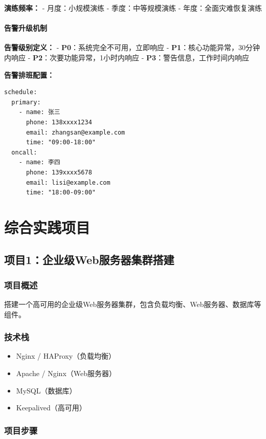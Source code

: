 \documentclass[12pt,UTF8]{ctexbook}
\begin{document}
\textbf{演练频率：}
- 月度：小规模演练
- 季度：中等规模演练
- 年度：全面灾难恢复演练

\subsubsection*{告警升级机制}

\textbf{告警级别定义：}
- \textbf{P0}：系统完全不可用，立即响应
- \textbf{P1}：核心功能异常，30分钟内响应
- \textbf{P2}：次要功能异常，1小时内响应
- \textbf{P3}：警告信息，工作时间内响应

\textbf{告警排班配置：}
\begin{lstlisting}
schedule:
  primary:
    - name: 张三
      phone: 138xxxx1234
      email: zhangsan@example.com
      time: "09:00-18:00"
  oncall:
    - name: 李四
      phone: 139xxxx5678
      email: lisi@example.com
      time: "18:00-09:00"
\end{lstlisting}

\chapter{综合实践项目}
\label{chap:practice-projects}

\section{项目1：企业级Web服务器集群搭建}
\label{sec:project-web-cluster}

\subsection*{项目概述}

搭建一个高可用的企业级Web服务器集群，包含负载均衡、Web服务器、数据库等组件。

\subsection*{技术栈}

\begin{itemize}
    \item Nginx / HAProxy（负载均衡）
    \item Apache / Nginx（Web服务器）
    \item MySQL（数据库）
    \item Keepalived（高可用）
\end{itemize}

\subsection*{项目步骤}
\end{document}
